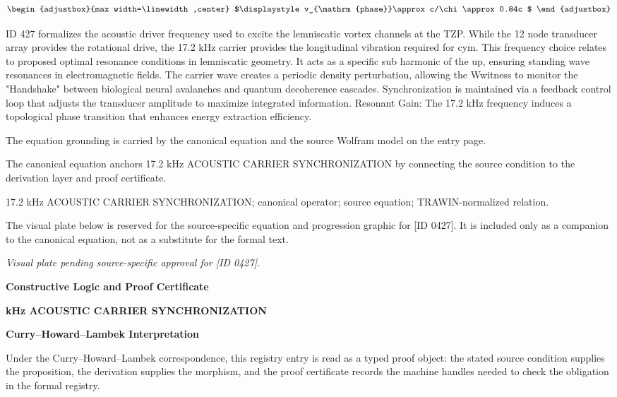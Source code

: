 \[
\begin{adjustbox}{max width=\linewidth,center}
$\displaystyle
v_{\mathrm{phase}}\approx c/\chi\approx0.84c
$
\end{adjustbox}
\]

ID 427 formalizes the acoustic driver frequency used to excite the lemniscatic vortex channels at the TZP. While the 12 node transducer array provides the rotational drive, the 17.2 kHz carrier provides the longitudinal vibration required for cym. This frequency choice relates to proposed optimal resonance conditions in lemniscatic geometry. It acts as a specific sub harmonic of the up, ensuring standing wave resonances in electromagnetic fields. The carrier wave creates a periodic density perturbation, allowing the Wwitness to monitor the "Handshake" between biological neural avalanches and quantum decoherence cascades. Synchronization is maintained via a feedback control loop that adjusts the transducer amplitude to maximize integrated information. Resonant Gain: The 17.2 kHz frequency induces a topological phase transition that enhances energy extraction efficiency.

The equation grounding is carried by the canonical equation and the source Wolfram model on the entry page.

The canonical equation anchors 17.2 kHz ACOUSTIC CARRIER SYNCHRONIZATION by connecting the source condition to the derivation layer and proof certificate.

17.2 kHz ACOUSTIC CARRIER SYNCHRONIZATION; canonical operator; source equation; TRAWIN-normalized relation.
\endgroup

\begingroup\footnotesize\sloppy
The visual plate below is reserved for the source-specific equation and progression graphic for [ID 0427]. It is included only as a companion to the canonical equation, not as a substitute for the formal text.
\par\endgroup
\begingroup\footnotesize\itshape
Visual plate pending source-specific approval for [ID 0427].
\par\endgroup

\clearpage
\begingroup\tzpsupportsetup
\noindent\textbf{\fontsize{10.8pt}{12.8pt}\selectfont [ID 0427] Constructive Logic and Proof Certificate}\par
\noindent\textbf{\fontsize{10pt}{12pt} kHz ACOUSTIC CARRIER SYNCHRONIZATION}\par
\vspace{0.45em}
\begingroup
\footnotesize
\setlength{\parskip}{0.22em}
\setlength{\parindent}{0pt}
\noindent\textbf{Curry--Howard--Lambek Interpretation}\par
Under the Curry--Howard--Lambek correspondence, this registry entry is read as a typed proof
object: the stated source condition supplies the proposition, the derivation supplies the
morphism, and the proof certificate records the machine handles needed to check the obligation
in the formal registry.

